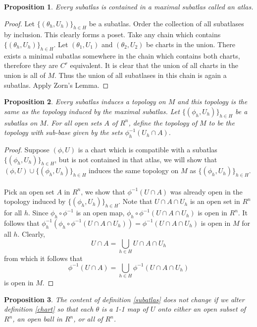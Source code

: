 \documentclass{article}
\theoremstyle{problemstyle}
\theoremstyle{problemstyle}
\theoremstyle{problemstyle}
\theoremstyle{problemstyle}
\newtheorem{proposition}{Proposition}
\theoremstyle{problemstyle}
\begin{document}
\begin{proposition}\label{existance of maximal atlases}
Every subatlas is contained in a maximal subatlas called an atlas. 
\end{proposition}

\begin{proof}
Let $\{(\theta_h,U_h)\}_{h \in H}$ be a subatlas. Order the collection of all subatlases by inclusion. This clearly forms a poset. Take any chain which contains $\{(\theta_h,U_h)\}_{h \in H}$.  Let $(\theta_1,U_1)$ and $(\theta_2,U_2)$ be charts in the union. There exists a minimal subatlas somewhere in the chain which contains both charts, therefore they are $C^r$ equivalent. It is clear that the union of all charts in the union is all of $M$. Thus the union of all subatlases in this chain is again a subatlas. Apply Zorn's Lemma. 
\end{proof}

\begin{proposition}
Every subatlas induces a topology on $M$ and this topology is the same as the topology induced by the maximal subatlas. Let $\{(\phi_h,U_h)\}_{h \in H}$ be a subatlas on $M$. For all open sets $A$ of $R^n$, define the topology of $M$ to be the topology with sub-base given by the sets $\phi_h^{-1}(U_h \cap A)$.
\end{proposition}

\begin{proof}
Suppose $(\phi,U)$ is a chart which is compatible with a subatlas $\{(\phi_h,U_h)\}_{h \in H}$, but is not contained in that atlas, we will show that $(\phi,U) \cup \{(\phi_h,U_h)\}_{h \in H}$ induces the same topology on $M$ as $\{(\phi_h,U_h)\}_{h \in H}$.\\\\
Pick an open set $A$ in $R^n$, we show that $\phi^{-1}(U \cap A)$ was already open in the topology induced by $\{(\phi_h,U_h)\}_{h \in H}$. Note that $U \cap A \cap U_h$ is an open set in $R^n$ for all $h$. Since $\phi_h\circ\phi^{-1}$ is an open map, $\phi_h\circ\phi^{-1}(U\cap A \cap U_h)$ is open in $R^n$. It follows that $\phi_h^{-1}(\phi_h\circ\phi^{-1}(U\cap A \cap U_h)) = \phi^{-1}(U\cap A \cap U_h)$ is open in $M$ for all $h$. Clearly, $$U \cap A = \bigcup_{h \in H}U\cap A\cap U_h$$ from which it follows that $$\phi^{-1}(U \cap A) = \bigcup_{h \in H}\phi^{-1}(U\cap A\cap U_h)$$ is open in $M$. 
\end{proof}

\begin{proposition}
The content of definition \ref{subatlas} does not change if we alter definition \ref{chart} so that each $\theta$ is a 1-1 map of $U$ onto either an open subset of $R^n$, an open ball in $R^n$, or all of $R^n$. \cite{Spivak99}
\end{proposition}
\end{document}
